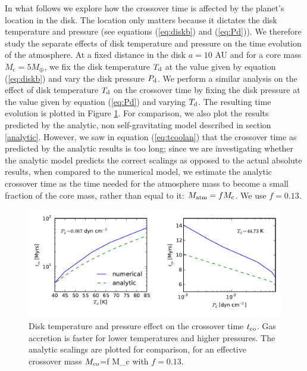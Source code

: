 \documentclass[apj]{emulateapj}
\begin{document}
In what follows we explore how the crossover time is affected by the planet's location in the disk. The location only matters because it dictates the disk temperature and pressure (see equations (\ref{eq:diskb}) and (\ref{eq:Pd})). We therefore study the separate effects of disk temperature and pressure on the time evolution of the atmosphere. At a fixed distance in the disk $a=10$ AU and for a core mass $M_{\mathrm{c}}=5 M_{\oplus}$, we fix the disk temperature $T_{\rm{d}}$ at the value given by equation (\ref{eq:diskb}) and vary the disk pressure $P_{\rm{d}}$. We perform a similar analysis on the effect of disk temperature $T_{\rm{d}}$ on the crossover time by fixing the disk pressure at the value given by equation (\ref{eq:Pd}) and varying $T_{\rm{d}}$. The resulting time evolution is plotted in Figure \ref{fig:TPeffects}. For comparison, we also plot the results predicted by the analytic, non self-gravitating model described in section \ref{analytic}. However, we saw in equation (\ref{eq:tcoolan}) that the crossover time as predicted by the analytic results is too long; since we are investigating whether the analytic model predicts the correct scalings as opposed to the actual absolute results, when compared to the numerical model, we estimate the analytic crossover time as the time needed for the atmosphere mass to become a small fraction of the core mass, rather than equal to it: $M_{\rm{atm}}=f M_{\rm c}$. We use $f = 0.13$.

\begin{figure}[tb]
\centering
\includegraphics[width=1.\textwidth]{../../figs/ModelAtmospheres/RadSelfGravPoly/PaperFigs/TdPd_effect.pdf}
\caption{Disk temperature and pressure effect on the crossover time $t_{\rm{co}}$. Gas accretion is faster for lower temperatures and higher pressures. The analytic scalings are plotted for comparison, for an effective crossover mass $M_{\rm{co}}$=f M_{\rm c} with $f=0.13$.}
\label{fig:TPeffects}
\end{figure}
\end{document}
